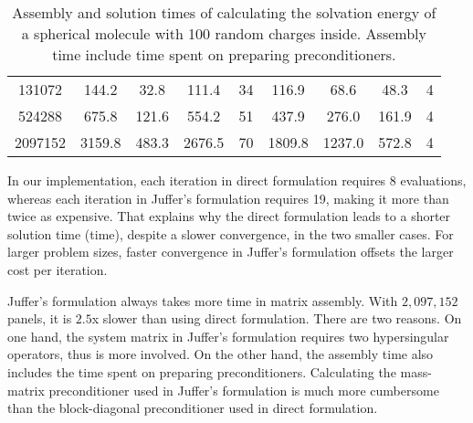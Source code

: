 \begin{table*}[]
\begin{tabular}{c|cccc|cccc}
    131072                                                       & 144.2                                                    & 32.8                                                        & 111.4                                                    & 34            & 116.9                                                    & 68.6                                                        & 48.3                                                     & 4            \\
    524288                                                       & 675.8                                                    & 121.6                                                       & 554.2                                                    & 51            & 437.9                                                    & 276.0                                                       & 161.9                                                    & 4            \\
    2097152                                                      & 3159.8                                                   & 483.3                                                       & 2676.5                                                   & 70            & 1809.8                                                   & 1237.0                                                      & 572.8                                                    & 4           
    \end{tabular}
    \caption{Assembly and solution times of calculating the solvation energy of a spherical molecule with 100 random charges inside.
    Assembly time include time spent on preparing preconditioners.}
    \label{tab:sphere_time}
\end{table*}

In our implementation, each iteration in direct formulation requires $8$ \fmm evaluations, whereas each iteration in Juffer's formulation requires 19, making it more than twice as expensive.
That explains why the direct formulation leads to a shorter solution time (\gmres time), despite a slower convergence, in the two smaller cases.
For larger problem sizes, faster convergence in Juffer's formulation offsets the larger cost per iteration.

Juffer's formulation always takes more time in matrix assembly.
With $2,097,152$ panels, it is $2.5$x slower than using direct formulation.
There are two reasons.
On one hand, the system matrix in Juffer's formulation requires two hypersingular operators, thus is more involved.
On the other hand, the assembly time also includes the time spent on preparing preconditioners.
Calculating the mass-matrix preconditioner used in Juffer's formulation is much more cumbersome than the block-diagonal preconditioner used in direct formulation.

